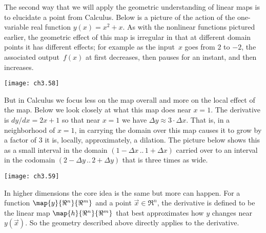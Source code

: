 The second way that we will apply 
the geometric understanding of linear maps 
is to elucidate a point from Calculus.
Below is a picture
of the action of the one-variable real function \( y(x)=x^2+x \).
As with the nonlinear functions pictured earlier, 
the geometric effect of this map is
irregular in that at different domain points it has different effects; for
example as the input~$x$ goes from $2$ to $-2$, the associated output~$f(x)$ 
at first decreases, then pauses for an instant,
and then increases.
\begin{center}
  \texttt{[image: ch3.58]}
\end{center}
But in Calculus we focus less on the map overall and more 
on the local effect of the map.
Below we look closely at what this map
does near $x=1$.
The derivative is $dy/dx=2x+1$
so that near \( x=1 \) 
we have \( \Delta y\approx 3\cdot\Delta x \).
That is, in a neighborhood of $x=1$,
in carrying the domain over this map causes it to grow by
a factor of $3$ \Dash  it is, locally, 
approximately, a dilation.
The picture below shows this as a small interval 
in the domain $(1-\Delta x\,..\,1+\Delta x)$
carried over to an interval in the codomain $(2-\Delta y\,..\,2+\Delta y)$
that is three times as wide. %
\begin{center}
  \texttt{[image: ch3.59]}
\end{center}

In higher dimensions the core idea is the same but more can happen.
For a function \( \map{y}{\Re^n}{\Re^m} \) and a point \( \vec{x}\in\Re^n \),
the derivative is defined to be the 
linear map \( \map{h}{\Re^n}{\Re^m} \) that best approximates
how \( y \) changes near \( y(\vec{x}) \).
So the geometry described above directly applies to the derivative.

